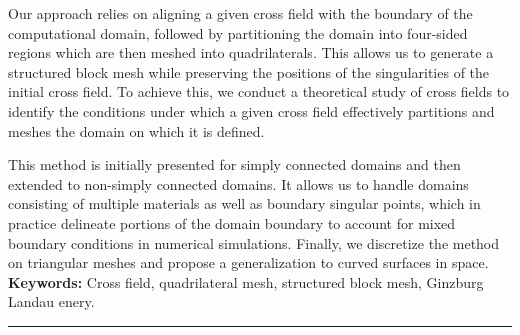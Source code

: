 \begin{vcenterpage}
Our approach relies on aligning a given cross field with the boundary of the computational domain, followed by partitioning the domain into four-sided regions which are then meshed into quadrilaterals. This allows us to generate a structured block mesh while preserving the positions of the singularities of the initial cross field. To achieve this, we conduct a theoretical study of cross fields to identify the conditions under which a given cross field effectively partitions and meshes the domain on which it is defined.

This method is initially presented for simply connected domains and then extended to non-simply connected domains. It allows us to handle domains consisting of multiple materials as well as boundary singular points, which in practice delineate portions of the domain boundary to account for mixed boundary conditions in numerical simulations. Finally, we discretize the method on triangular meshes and propose a generalization to curved surfaces in space.\\


{\textbf{Keywords:}}
    Cross field, quadrilateral mesh, structured block mesh, Ginzburg Landau enery.
\\
\noindent\rule[2pt]{\textwidth}{0.5pt}
\end{vcenterpage}

